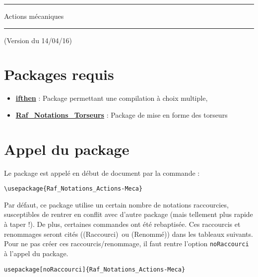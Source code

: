 \documentclass[a4paper,12pt]{article}
\newcommand{\rac}{({\color{red}Raccourci})}
\newcommand{\ren}{({\color{blue}Renommé})}
\begin{document}
	\begin{center}
		\hrule{\Large Actions mécaniques}\\\hrule
	\end{center}

(Version du 14/04/16)

	\section{Packages requis}

	\begin{itemize}
		\item \href{http://www.ctan.org/pkg/ifthen}{\textbf{ifthen}} : Package permettant une compilation à choix multiple,
		\item \href{http://www.ctan.org/pkg/color}{\textbf{Raf\_Notations\_Torseurs}} : Package de mise en forme des torseurs
	\end{itemize}

	\section{Appel du package}

	Le package est appelé en début de document par la commande :
	\begin{verbatim}
\usepackage{Raf_Notations_Actions-Meca}
	\end{verbatim}

	Par défaut, ce package utilise un certain nombre de notations raccourcies, susceptibles de rentrer en conflit avec d'autre package (mais tellement plus rapide à taper !).
	De plus, certaines commandes ont été rebaptisée.
	Ces raccourcis et renommages seront cités (\rac\ ou \ren) dans les tableaux suivants.
	Pour ne pas créer ces raccourcis/renommage, il faut rentre l'option \verb!noRaccourci! à l'appel du package.

	\begin{verbatim}
usepackage[noRaccourci]{Raf_Notations_Actions-Meca}
	\end{verbatim}
\end{document}
